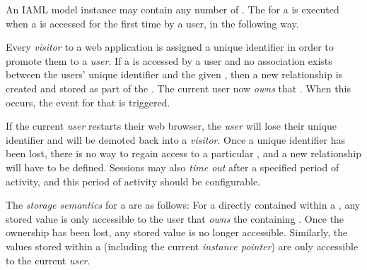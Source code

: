 An IAML model instance may contain any number of . The   for a  is executed when a  is accessed for the first time by a user, in the following way.

Every \textit{visitor} to a web application is assigned a unique identifier in order to promote them to a \textit{user}. If a  is accessed by a user and no association exists between the users' unique identifier and the given , then a new relationship is created and stored as part of the . The current user now \textit{owns} that . When this occurs, the  event for that  is triggered.

If the current \textit{user} restarts their web browser, the \textit{user} will lose their unique identifier and will be demoted back into a \textit{visitor}. Once a unique identifier has been lost, there is no way to regain access to a particular , and a new  relationship will have to be defined. Sessions may also \textit{time out} after a specified period of activity, and this period of activity should be configurable.

The \textit{storage semantics} for a  are as follows: For a  directly contained within a , any stored value is only accessible to the user that \textit{owns} the containing . Once the  ownership has been lost, any stored value is no longer accessible. Similarly, the values stored within a  (including the current \textit{instance pointer}) are only accessible to the current \textit{user}.
